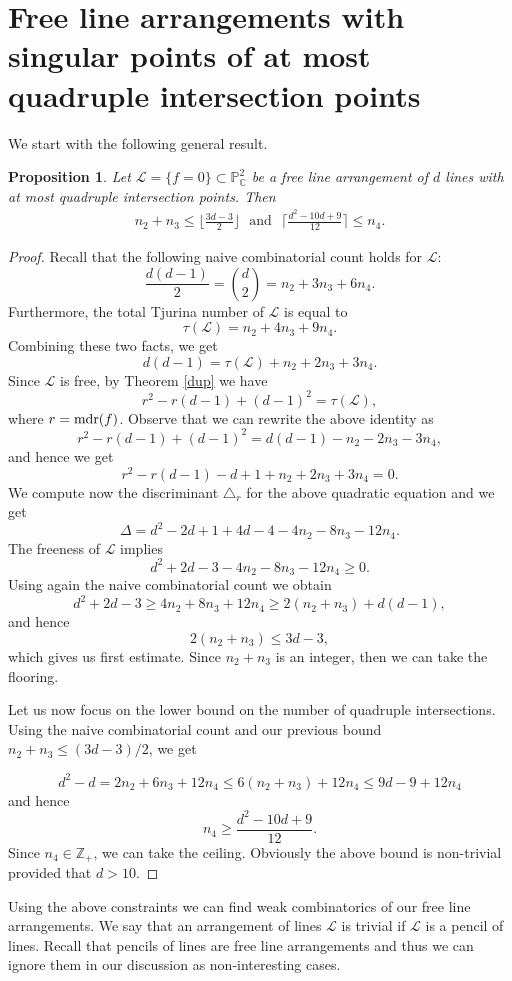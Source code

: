 \documentclass[12pt]{article}
\theoremstyle{plain}
\newtheorem{proposition}[thm]{Proposition}
\theoremstyle{definition}
\begin{document}
\section{Free line arrangements with singular points of at most quadruple intersection points}
We start with the following general result.
\begin{proposition}\label{EstimDLine}
Let $\mathcal{L} = \{f = 
0\}\subset\mathbb{P}^2_{\mathbb{C}}$ be a 
free line arrangement of $d$ 
lines with  at 
most quadruple intersection points. 
Then 
\begin{align}\label{EstimateD}
n_2+n_3\leq \bigg\lfloor\frac{3d-3}{2}\bigg\rfloor \:\:\:\text{and}\:\:\:  
\bigg\lceil\frac{d^2-10d+9}{12}\bigg\rceil\leq n_4.     
\end{align}
\end{proposition}
\begin{proof}
Recall that the following naive combinatorial count holds for $\mathcal{L}$:
$$\frac{d(d-1)}{2}=\binom{d}{2}=n_2+3n_3+6n_4.$$
Furthermore, the total Tjurina number of $\mathcal{L}$ is equal to
$$\tau(\mathcal{L}) = n_{2} + 4n_{3} + 9n_{4}.$$
Combining these two facts, we get
$$d(d-1)=\tau(\mathcal{L})+n_2+2n_3+3n_4.$$
Since $\mathcal{L}$ is free, by Theorem \ref{dup} we have
$$r^2-r(d-1)+(d-1)^2=\tau(\mathcal{L}),$$
where $r={\rm mdr}(f)$.
Observe that we can rewrite the above identity as
$$r^2-r(d-1)+(d-1)^2=d(d-1)-n_2-2n_3-3n_4,$$
and hence we get
$$r^2-r(d-1)-d+1+n_2+2n_3+3n_4=0.$$
We compute now the discriminant $\triangle_{r}$ for the above quadratic equation and we get
$$\Delta=d^2-2d+1+4d-4-4n_2-8n_3-12n_4.$$
The freeness of $\mathcal{L}$ implies
$$d^2+2d-3-4n_2-8n_3-12n_4 \geq 0.$$
Using again the naive combinatorial count we obtain
$$d^2+2d-3 \geq 4n_2+8n_3+12n_4 \geq 2(n_2+n_3)+d(d-1),$$
and hence
$$2(n_2+n_3) \leq 3d-3,$$
which gives us first estimate. Since $n_{2}+n_{3}$ is an integer, then we can take the flooring. 

Let us now focus on the lower bound on the number of quadruple intersections. 
Using the naive combinatorial count and our previous bound $n_{2}+n_{3} \leq (3d-3)/2$, we get

$$d^2-d=2n_2+6n_3+12n_4 \leq 6(n_2+n_3)+12n_4 \leq 9d-9+12n_4$$
and hence
$$n_4 \geq \frac{d^2-10d+9}{12}.$$
Since $n_{4} \in \mathbb{Z}_{+}$, we can take the ceiling. Obviously the above bound is non-trivial provided that $d>10$.
\end{proof}
Using the above constraints we can find weak combinatorics of our free line arrangements. We say that an arrangement of lines $\mathcal{L}$ is trivial if $\mathcal{L}$ is a pencil of lines. Recall that pencils of lines are free line arrangements and thus we can ignore them in our discussion as non-interesting cases. 
\end{document}
